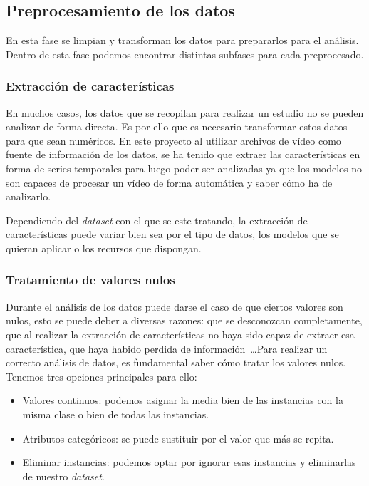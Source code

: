 \subsection{Preprocesamiento de los datos}
En esta fase se limpian y transforman los datos para prepararlos para el análisis. Dentro de esta fase podemos encontrar distintas subfases para cada preprocesado.

\subsubsection{Extracción de características}
En muchos casos, los datos que se recopilan para realizar un estudio no se pueden analizar de forma directa. Es por ello que es necesario transformar estos datos para que sean numéricos. En este proyecto al utilizar archivos de vídeo como fuente de información de los datos, se ha tenido que extraer las características en forma de series temporales para luego poder ser analizadas ya que los modelos no son capaces de procesar un vídeo de forma automática y saber cómo ha de analizarlo.

Dependiendo del \textit{dataset} con el que se este tratando, la extracción de características puede variar bien sea por el tipo de datos, los modelos que se quieran aplicar o los recursos que dispongan.

\subsubsection{Tratamiento de valores nulos}
Durante el análisis de los datos puede darse el caso de que ciertos valores son nulos, esto se puede deber a diversas razones: que se desconozcan completamente, que al realizar la extracción de características no haya sido capaz de extraer esa característica, que haya habido perdida de información~\ldots Para realizar un correcto análisis de datos, es fundamental saber cómo tratar los valores nulos. Tenemos tres opciones principales para ello:
\begin{itemize}
\item Valores continuos: podemos asignar la media bien de las instancias con la misma clase o bien de todas las instancias.
\item Atributos categóricos: se puede sustituir por el valor que más se repita.
\item Eliminar instancias: podemos optar por ignorar esas instancias y eliminarlas de nuestro \textit{dataset}.
\end{itemize} 

